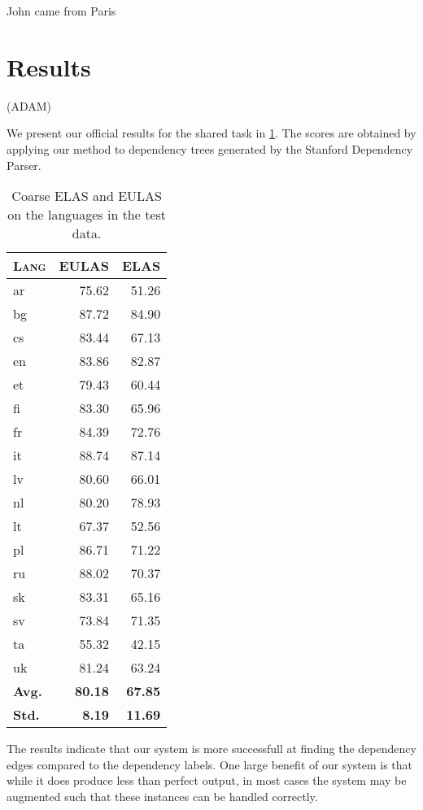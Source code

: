 \documentclass[11pt,a4paper]{article}
\begin{document}
John came from Paris


\section{Results}
(ADAM)

We present our official results for the shared task in
\cref{tab:test}. The scores are obtained by applying our method
to dependency trees generated by the Stanford Dependency Parser.
 

\begin{table}[h]
	\centering
	\begin{tabular}{l|rr}
		\textsc{Lang} & \textsc{EULAS} & \textsc{ELAS} \\
		\hline
		ar & 75.62 & 51.26 \\
		bg & 87.72 & 84.90 \\
		cs & 83.44 & 67.13 \\
		en & 83.86 & 82.87 \\
		et & 79.43 & 60.44 \\
		fi & 83.30 & 65.96 \\
		fr & 84.39 & 72.76 \\
		it & 88.74 & 87.14 \\
		lv & 80.60 & 66.01 \\
		nl & 80.20 & 78.93 \\
		lt & 67.37 & 52.56 \\
		pl & 86.71 & 71.22 \\
		ru & 88.02 & 70.37 \\
		sk & 83.31 & 65.16 \\
		sv & 73.84 & 71.35 \\
		ta & 55.32 & 42.15 \\
		uk & 81.24 & 63.24 \\
		\textbf{Avg.} & \textbf{80.18} & \textbf{67.85} \\
        \textbf{Std.} & \textbf{8.19} & \textbf{11.69} \\
	\end{tabular}
\caption{\label{tab:test} Coarse ELAS and EULAS on the languages in the test data.}
\end{table}

The results indicate that our system is more successfull at
finding the dependency edges compared to the dependency
labels. One large benefit of our system is that while it does
produce less than perfect output, in most cases the system may be
augmented such that these instances can be handled correctly.
\end{document}
